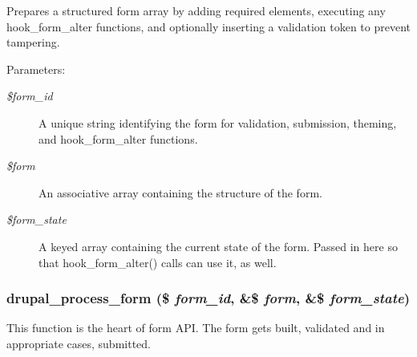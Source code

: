 Prepares a structured form array by adding required elements, executing any hook\_\-form\_\-alter functions, and optionally inserting a validation token to prevent tampering.

\begin{Desc}
\item[Parameters:]
\begin{description}
\item[{\em \$form\_\-id}]A unique string identifying the form for validation, submission, theming, and hook\_\-form\_\-alter functions. \item[{\em \$form}]An associative array containing the structure of the form. \item[{\em \$form\_\-state}]A keyed array containing the current state of the form. Passed in here so that hook\_\-form\_\-alter() calls can use it, as well. \end{description}
\end{Desc}
\hypertarget{group__form__api_g61186f5c43533761544a778918818fd2}{
\subsubsection[{drupal\_\-process\_\-form}]{\setlength{\rightskip}{0pt plus 5cm}drupal\_\-process\_\-form (\$ {\em form\_\-id}, \/  \&\$ {\em form}, \/  \&\$ {\em form\_\-state})}}
\label{group__form__api_g61186f5c43533761544a778918818fd2}


This function is the heart of form API. The form gets built, validated and in appropriate cases, submitted.

